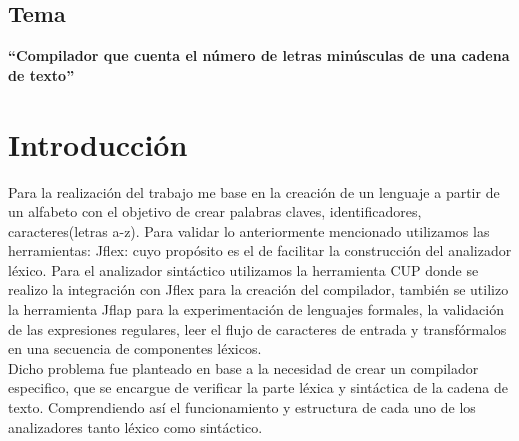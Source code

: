 \documentclass[a4paper,openright,12pt]{article}
\begin{document}
\renewcommand{\tablename}{Tabla}
\renewcommand{\listtablename}{Índice de tablas}
\renewcommand{\thesection}{\Alph{section}}
\renewcommand{\thesubsection}{\arabic                                                                                                                                                                                                                                                                                                                               {subsection} }

\renewcommand\listfigurename{Índice de figuras}

\setcounter{secnumdepth}{5}
\setcounter{tocdepth}{5}


\marginsize{3cm}{2cm}{2cm}{2cm}

\newpage
\tableofcontents
\newpage
\newpage
\vspace*{7 cm}
\begin{center}
\section{Tema}
\begin{Huge}
\textbf {“Compilador que cuenta el número de letras minúsculas de una cadena de texto”}
\end{Huge}
\end{center}



\newpage
\section{Introducción}

Para la realización del trabajo me base en la creación de un lenguaje a partir de un alfabeto con el objetivo de crear palabras claves, identificadores, caracteres(letras a-z).
Para validar lo anteriormente mencionado  utilizamos las herramientas:
Jflex: cuyo propósito es el de facilitar la construcción del analizador léxico. Para el analizador sintáctico utilizamos la herramienta CUP donde se realizo la integración con Jflex para la creación del compilador, también se utilizo la herramienta Jflap para la experimentación de lenguajes formales, la validación de las expresiones regulares, leer el flujo de caracteres de entrada  y transfórmalos en una secuencia de componentes léxicos.\\
Dicho problema fue planteado en base a la necesidad de crear un compilador especifico, que se encargue de verificar la parte léxica y sintáctica  de la cadena de texto. Comprendiendo así el funcionamiento y estructura de cada uno de los analizadores tanto léxico como sintáctico.
\end{document}

